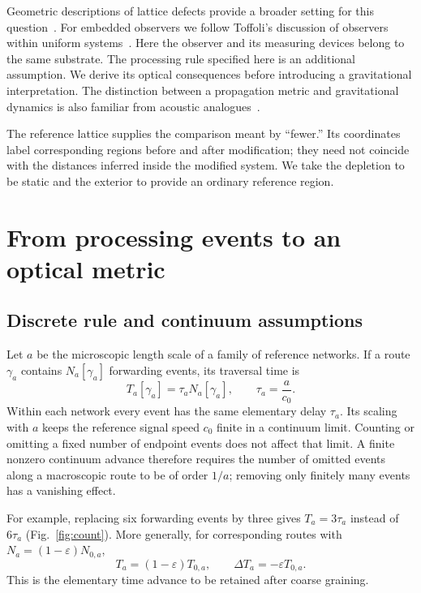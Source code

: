 \documentclass[aps,prd,reprint,nofootinbib]{revtex4-2}
\newcommand{\ve}{\varepsilon}
\begin{document}
Geometric descriptions of lattice defects provide a broader setting
for this question~\cite{kleinert-2004}. For embedded observers we follow
Toffoli's discussion of observers within uniform systems~\cite{toffoli:79}.
Here the observer and its measuring devices belong to the same
substrate. The processing rule specified here is an additional
assumption. We derive its optical
consequences before introducing a gravitational interpretation. The
distinction between a propagation metric and gravitational dynamics is
also familiar from acoustic analogues~\cite{VisserAnalog}.

The reference lattice supplies the comparison meant by ``fewer.'' Its
coordinates label corresponding regions before and after modification;
they need not coincide with the distances inferred inside the modified
system. We take the depletion to be static and the exterior to provide
an ordinary reference region.

\section{From processing events to an optical metric}
\label{sec:count}

\subsection{Discrete rule and continuum assumptions}

Let $a$ be the microscopic length scale of a family of reference
networks. If a route $\gamma_a$ contains $N_a[\gamma_a]$ forwarding
events, its traversal time is
\begin{equation}
 T_a[\gamma_a]=\tau_a N_a[\gamma_a],
 \qquad \tau_a=\frac{a}{c_0}.
 \label{eq:discrete}
\end{equation}
Within each network every event has the same elementary delay $\tau_a$.
Its scaling with $a$ keeps the reference signal speed $c_0$ finite in a
continuum limit. Counting or omitting a fixed number of endpoint events
does not affect that limit.
A finite nonzero continuum advance therefore requires the number of
omitted events along a macroscopic route to be of order $1/a$; removing
only finitely many events has a vanishing effect.

For example, replacing six forwarding events by three gives
$T_a=3\tau_a$ instead of $6\tau_a$ (Fig.~\ref{fig:count}). More generally,
for corresponding routes with $N_a=(1-\ve)N_{0,a}$,
\begin{equation}
 T_a=(1-\ve)T_{0,a},
 \qquad \Delta T_a=-\ve T_{0,a}.
 \label{eq:elementary}
\end{equation}
This is the elementary time advance to be retained after coarse
graining.
\end{document}
